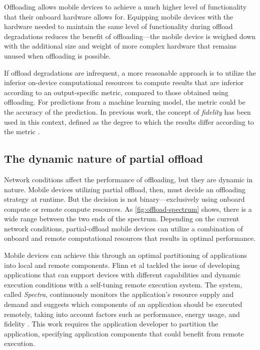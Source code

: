 Offloading allows mobile devices to achieve a much higher level of
functionality that their onboard hardware allows for. Equipping mobile devices
with the hardware needed to maintain the same level of functionality during
offload degradations reduces the benefit of offloading---the mobile device is
weighed down with the additional size and weight of more complex hardware that
remains unused when offloading is possible.

If offload degradations are infrequent, a more reasonable approach is to
utilize the inferior on-device computational resources to compute results that
are inferior according to an output-specific metric, compared to those obtained
using offloading. For predictions from a machine learning model, the metric
could be the accuracy of the prediction. In previous work, the concept of
\textit{fidelity} has been used in this context, defined as the degree to which
the results differ according to the metric \cite{noble1997}.

\subsection{The dynamic nature of partial offload}

Network conditions affect the performance of offloading, but they are dynamic
in nature. Mobile devices utilizing partial offload, then, must decide an
offloading strategy at runtime. But the decision is not binary---exclusively
using onboard compute or remote compute resources.  As
\cref{fig:offload-spectrum} shows, there is a wide range between the two ends
of the spectrum. Depending on the current network conditions, partial-offload
mobile devices can utilize a combination of onboard and remote computational
resources that results in optimal performance.

Mobile devices can achieve this through an optimal partitioning of applications
into local and remote components. Flinn et al tackled the issue of developing
applications that can support devices with different capabilities and dynamic
execution conditions with a self-tuning remote execution system. The system,
called \textit{Spectra}, continuously monitors the application's resource
supply and demand and suggests which components of an application should be
executed remotely, taking into account factors such as performance, energy
usage, and fidelity \cite{flinn2002}. This work requires the application
developer to partition the application, specifying application components
that could benefit from remote execution.

